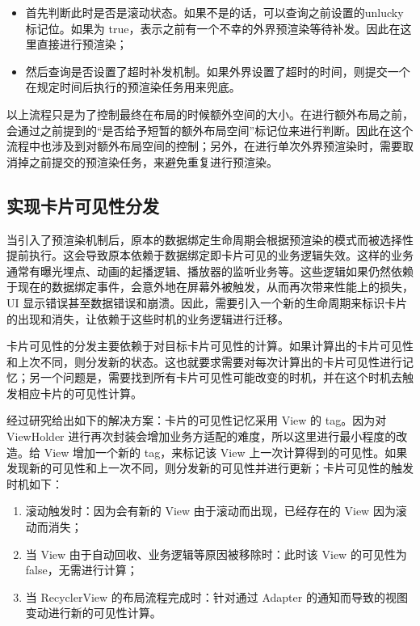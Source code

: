 \begin{itemize}
    \item 首先判断此时是否是滚动状态。如果不是的话，可以查询之前设置的unlucky 标记位。如果为 true，表示之前有一个不幸的外界预渲染等待补发。因此在这里直接进行预渲染；
    \item 然后查询是否设置了超时补发机制。如果外界设置了超时的时间，则提交一个在规定时间后执行的预渲染任务用来兜底。
\end{itemize}

以上流程只是为了控制最终在布局的时候额外空间的大小。在进行额外布局之前，会通过之前提到的“是否给予短暂的额外布局空间”标记位来进行判断。因此在这个流程中也涉及到对额外布局空间的控制；另外，在进行单次外界预渲染时，需要取消掉之前提交的预渲染任务，来避免重复进行预渲染。


\subsection{实现卡片可见性分发}

当引入了预渲染机制后，原本的数据绑定生命周期会根据预渲染的模式而被选择性提前执行。这会导致原本依赖于数据绑定即卡片可见的业务逻辑失效。这样的业务通常有曝光埋点、动画的起播逻辑、播放器的监听业务等。这些逻辑如果仍然依赖于现在的数据绑定事件，会意外地在屏幕外被触发，从而再次带来性能上的损失，UI 显示错误甚至数据错误和崩溃。因此，需要引入一个新的生命周期来标识卡片的出现和消失，让依赖于这些时机的业务逻辑进行迁移。

卡片可见性的分发主要依赖于对目标卡片可见性的计算。如果计算出的卡片可见性和上次不同，则分发新的状态。这也就要求需要对每次计算出的卡片可见性进行记忆；另一个问题是，需要找到所有卡片可见性可能改变的时机，并在这个时机去触发相应卡片的可见性计算。

经过研究给出如下的解决方案：卡片的可见性记忆采用 View 的 tag。因为对 ViewHolder 进行再次封装会增加业务方适配的难度，所以这里进行最小程度的改造。给 View 增加一个新的 tag，来标记该 View 上一次计算得到的可见性。如果发现新的可见性和上一次不同，则分发新的可见性并进行更新；卡片可见性的触发时机如下：

\begin{enumerate}
    \item 滚动触发时：因为会有新的 View 由于滚动而出现，已经存在的 View 因为滚动而消失；
    \item 当 View 由于自动回收、业务逻辑等原因被移除时：此时该 View 的可见性为false，无需进行计算；
    \item 当 RecyclerView 的布局流程完成时：针对通过 Adapter 的通知而导致的视图变动进行新的可见性计算。
\end{enumerate}


